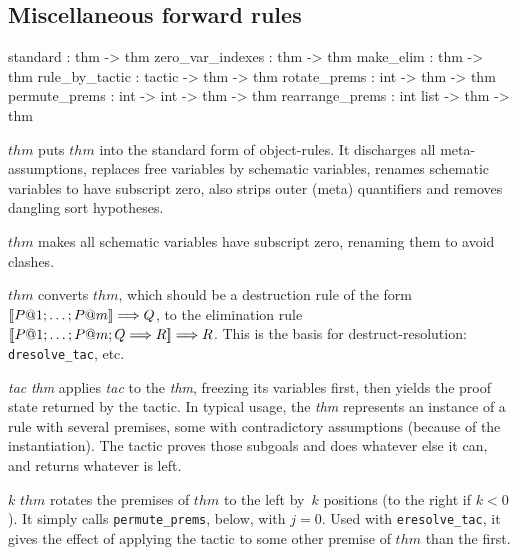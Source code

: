 \subsection{Miscellaneous forward rules}\label{MiscellaneousForwardRules}
\begin{ttbox} 
standard         :               thm -> thm
zero_var_indexes :               thm -> thm
make_elim        :               thm -> thm
rule_by_tactic   :     tactic -> thm -> thm
rotate_prems     :        int -> thm -> thm
permute_prems    : int -> int -> thm -> thm
rearrange_prems  :   int list -> thm -> thm
\end{ttbox}
\begin{ttdescription}
\item[\ttindexbold{standard} $thm$] puts $thm$ into the standard form
  of object-rules.  It discharges all meta-assumptions, replaces free
  variables by schematic variables, renames schematic variables to
  have subscript zero, also strips outer (meta) quantifiers and
  removes dangling sort hypotheses.

\item[\ttindexbold{zero_var_indexes} $thm$] 
makes all schematic variables have subscript zero, renaming them to avoid
clashes. 

\item[\ttindexbold{make_elim} $thm$] 
converts $thm$, which should be  a destruction rule of the form
$\mathopen{[\![} P@1;\ldots;P@m\mathclose{]\!]}\Longrightarrow 
Q$, to the elimination rule $\mathopen{[\![} P@1; \ldots; P@m; Q\Longrightarrow R\mathclose{]\!]}\Longrightarrow R$.  This
is the basis for destruct-resolution: {\tt dresolve_tac}, etc.

\item[\ttindexbold{rule_by_tactic} {\it tac} {\it thm}] 
  applies {\it tac\/} to the {\it thm}, freezing its variables first, then
  yields the proof state returned by the tactic.  In typical usage, the
  {\it thm\/} represents an instance of a rule with several premises, some
  with contradictory assumptions (because of the instantiation).  The
  tactic proves those subgoals and does whatever else it can, and returns
  whatever is left.
  
\item[\ttindexbold{rotate_prems} $k$ $thm$] rotates the premises of $thm$ to
  the left by~$k$ positions (to the right if $k<0$).  It simply calls
  \texttt{permute_prems}, below, with $j=0$.  Used with
  \texttt{eresolve_tac}, it
  gives the effect of applying the tactic to some other premise of $thm$ than
  the first.


\end{ttdescription}
